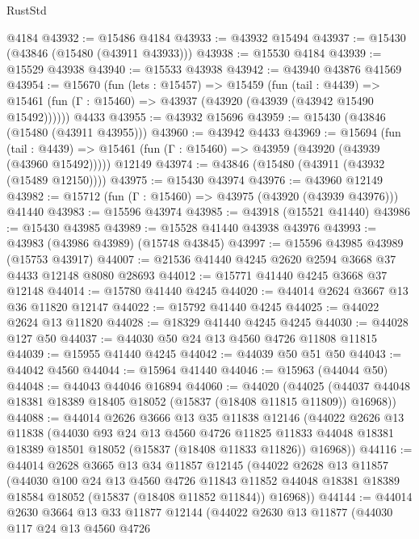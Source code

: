 \begin{lexlean}{RustStd}
\begin{coremodule}
    @4184
@43932 := @15486 @4184
@43933 := @43932 @15494
@43937 := @15430 (@43846 (@15480 (@43911 @43933)))
@43938 := @15530 @4184
@43939 := @15529 @43938
@43940 := @15533 @43938
@43942 := @43940 @43876 @41569
@43954 := @15670
    (fun (lets : @15457) =>
    @15459
      (fun (tail : @4439) =>
      @15461 (fun (Γ : @15460) => @43937 (@43920 (@43939 (@43942 @15490 @15492))))))
    @4433
@43955 := @43932 @15696
@43959 := @15430 (@43846 (@15480 (@43911 @43955)))
@43960 := @43942 @4433
@43969 := @15694
    (fun (tail : @4439) => @15461 (fun (Γ : @15460) => @43959 (@43920 (@43939 (@43960 @15492)))))
    @12149
@43974 := @43846 (@15480 (@43911 (@43932 (@15489 @12150))))
@43975 := @15430 @43974
@43976 := @43960 @12149
@43982 := @15712 (fun (Γ : @15460) => @43975 (@43920 (@43939 @43976))) @41440
@43983 := @15596 @43974
@43985 := @43918 (@15521 @41440)
@43986 := @15430 @43985
@43989 := @15528 @41440 @43938 @43976
@43993 := @43983 (@43986 @43989) (@15748 @43845)
@43997 := @15596 @43985 @43989 (@15753 @43917)
@44007 := @21536 @41440 @4245 @2620 @2594 @3668 @37 @4433 @12148 @8080 @28693
@44012 := @15771 @41440 @4245 @3668 @37 @12148
@44014 := @15780 @41440 @4245
@44020 := @44014 @2624 @3667 @13 @36 @11820 @12147
@44022 := @15792 @41440 @4245
@44025 := @44022 @2624 @13 @11820
@44028 := @18329 @41440 @4245 @4245
@44030 := @44028 @127 @50
@44037 := @44030 @50 @24 @13 @4560 @4726 @11808 @11815
@44039 := @15955 @41440 @4245
@44042 := @44039 @50 @51 @50
@44043 := @44042 @4560
@44044 := @15964 @41440
@44046 := @15963 (@44044 @50)
@44048 := @44043 @44046 @16894
@44060 := @44020
    (@44025 (@44037 @44048 @18381 @18389 @18405 @18052 (@15837 (@18408 @11815 @11809)) @16968))
@44088 := @44014
    @2626
    @3666
    @13
    @35
    @11838
    @12146
    (@44022
      @2626
      @13
      @11838
      (@44030
        @93
        @24
        @13
        @4560
        @4726
        @11825
        @11833
        @44048
        @18381
        @18389
        @18501
        @18052
        (@15837 (@18408 @11833 @11826))
        @16968))
@44116 := @44014
    @2628
    @3665
    @13
    @34
    @11857
    @12145
    (@44022
      @2628
      @13
      @11857
      (@44030
        @100
        @24
        @13
        @4560
        @4726
        @11843
        @11852
        @44048
        @18381
        @18389
        @18584
        @18052
        (@15837 (@18408 @11852 @11844))
        @16968))
@44144 := @44014
    @2630
    @3664
    @13
    @33
    @11877
    @12144
    (@44022
      @2630
      @13
      @11877
      (@44030
        @117
        @24
        @13
        @4560
        @4726

\end{coremodule}
\end{lexlean}
